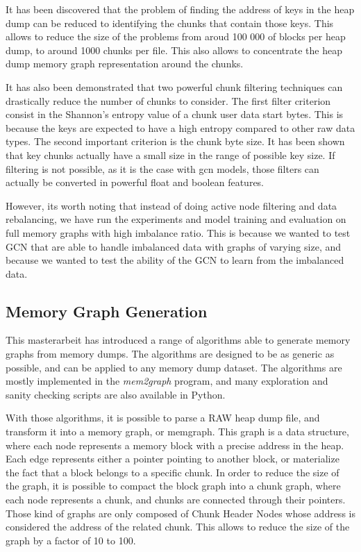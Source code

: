 It has been discovered that the problem of finding the address of keys in the heap dump can be reduced to identifying the chunks that contain those keys. This allows to reduce the size of the problems from aroud 100 000 of blocks per heap dump, to around 1000 chunks per file. This also allows to concentrate the heap dump memory graph representation around the chunks.

It has also been demonstrated that two powerful chunk filtering techniques can drastically reduce the number of chunks to consider. The first filter criterion consist in the Shannon's entropy value of a chunk user data start bytes. This is because the keys are expected to have a high entropy compared to other raw data types. The second important criterion is the chunk byte size. It has been shown that key chunks actually have a small size in the range of possible key size. If filtering is not possible, as it is the case with \acrshort{gcn} models, those filters can actually be converted in powerful float and boolean features.

However, its worth noting that instead of doing active node filtering and data rebalancing, we have run the experiments and model training and evaluation on full memory graphs with high imbalance ratio. This is because we wanted to test GCN that are able to handle imbalanced data with graphs of varying size, and because we wanted to test the ability of the GCN to learn from the imbalanced data. 

\subsection{Memory Graph Generation}
This masterarbeit has introduced a range of algorithms able to generate memory graphs from memory dumps. The algorithms are designed to be as generic as possible, and can be applied to any memory dump dataset. The algorithms are mostly implemented in the \textit{mem2graph} program, and many exploration and sanity checking scripts are also available in Python.

With those algorithms, it is possible to parse a RAW heap dump file, and transform it into a memory graph, or memgraph. This graph is a data structure, where each node represents a memory block with a precise address in the heap. Each edge represents either a pointer pointing to another block, or materialize the fact that a block belongs to a specific chunk. In order to reduce the size of the graph, it is possible to compact the block graph into a chunk graph, where each node represents a chunk, and chunks are connected through their pointers. Those kind of graphs are only composed of Chunk Header Nodes whose address is considered the address of the related chunk. This allows to reduce the size of the graph by a factor of 10 to 100.

